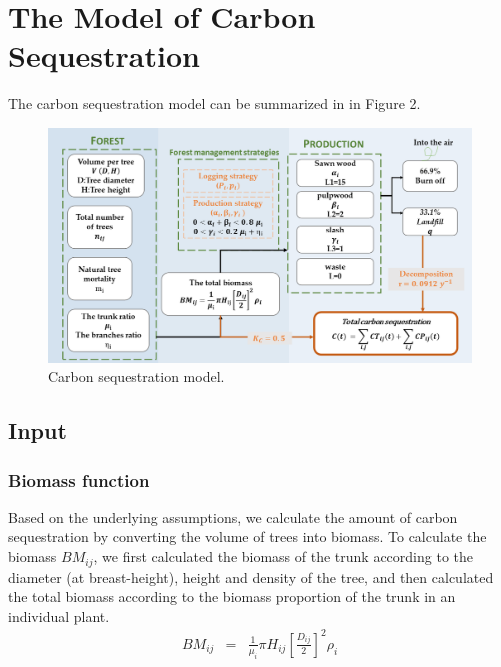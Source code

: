 
\section{The Model of Carbon Sequestration}
The carbon sequestration model can be summarized in in Figure 2.

\begin{figure}[htp]
    \centering
    \includegraphics[width=15cm]{figs/Carbon_model.png}
    \caption{Carbon sequestration model.}
    \label{fig:my_label}
\end{figure}

\subsection{Input}

\subsubsection{Biomass function}
Based on the underlying assumptions, we calculate the amount of carbon sequestration by converting the volume of trees into biomass. To calculate the biomass $BM_{ij}$, we first calculated the biomass of the trunk according to the diameter (at breast-height), height and density of the tree, and then calculated the total biomass according to the biomass proportion of the trunk in an individual plant.
\begin{eqnarray}
B M_{i j} & = & \frac{1}{\mu_{i}} \pi H_{i j}\left[\frac{D_{i j}}{2}\right]^{2} \rho_{i}
\end{eqnarray}

